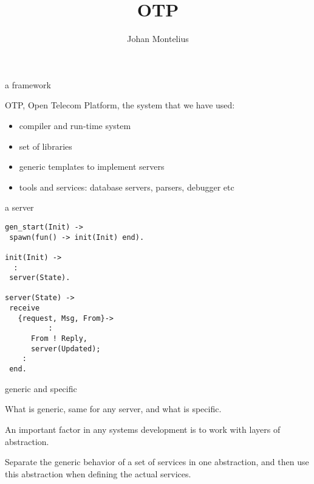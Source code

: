 


\title[ID1019 OTP]{OTP}


\author{Johan Montelius}
\date{\semester}



\begin{frame}
\titlepage
\end{frame}

\begin{frame}{a framework}

OTP, Open Telecom Platform, the system that we have used:

\pause\vspace{20pt}
\begin{itemize}
\item compiler and run-time system
\item set of libraries
\item generic templates to implement servers  
\item tools and services: database servers, parsers, debugger etc
\end{itemize}

\end{frame}


\begin{frame}[fragile]{a server}

\begin{verbatim}
gen_start(Init) ->
 spawn(fun() -> init(Init) end).

init(Init) -> 
  :
 server(State).

server(State) ->
 receive
   {request, Msg, From}->
          :
      From ! Reply,
      server(Updated);
    :
 end.           
\end{verbatim}

\end{frame}

\begin{frame}{generic and specific}

What is generic, same for any server, and what is specific.

\pause\vspace{20pt}

An important factor in any systems development is to work with layers
of abstraction. 

\vspace{20pt}
Separate the generic behavior of a set of services in one abstraction, and
then use this abstraction when defining the actual services.

\end{frame}

